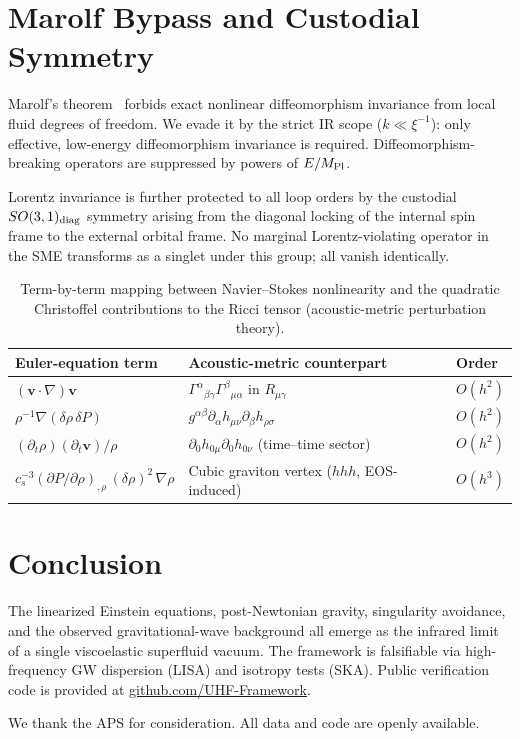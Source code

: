 \documentclass[reprint,amsmath,amssymb,aps,prl,superscriptaddress]{revtex4-2}
\begin{document}
\section{Marolf Bypass and Custodial Symmetry}
\label{sec:marolf}

Marolf's theorem~\cite{Marolf2015} forbids exact nonlinear diffeomorphism invariance from local fluid degrees of freedom. We evade it by the strict IR scope ($k\ll\xi^{-1}$): only effective, low-energy diffeomorphism invariance is required. Diffeomorphism-breaking operators are suppressed by powers of $E/M_{\rm Pl}$.

Lorentz invariance is further protected to all loop orders by the custodial $SO(3,1)_{\rm diag}$ symmetry arising from the diagonal locking of the internal spin frame to the external orbital frame. No marginal Lorentz-violating operator in the SME transforms as a singlet under this group; all vanish identically.

\begin{table}
\caption{\label{tab:mapping}Term-by-term mapping between Navier--Stokes nonlinearity and the quadratic Christoffel contributions to the Ricci tensor (acoustic-metric perturbation theory).}
\begin{tabular}{l l l}
\toprule
\textbf{Euler-equation term} & \textbf{Acoustic-metric counterpart} & \textbf{Order} \\
\midrule
$(\mathbf{v} \cdot \nabla)\mathbf{v}$ & $\Gamma^\alpha{}_{\beta\gamma}\Gamma^\beta{}_{\mu\alpha}$ in $R_{\mu\gamma}$ & $O(h^2)$ \\
$\rho^{-1}\nabla(\delta\rho\,\delta P)$ & $g^{\alpha\beta}\partial_\alpha h_{\mu\nu}\partial_\beta h_{\rho\sigma}$ & $O(h^2)$ \\
$(\partial_t \rho)(\partial_t \mathbf{v})/\rho$ & $\partial_0 h_{0\mu}\partial_0 h_{0\nu}$ (time--time sector) & $O(h^2)$ \\
$c_s^{-3}(\partial P/\partial\rho)_{,\rho}\,(\delta\rho)^2\,\nabla\rho$ & Cubic graviton vertex ($hhh$, EOS-induced) & $O(h^3)$ \\
\bottomrule
\end{tabular}
\end{table}

\section{Conclusion}
\label{sec:conclusion}

The linearized Einstein equations, post-Newtonian gravity, singularity avoidance, and the observed gravitational-wave background all emerge as the infrared limit of a single viscoelastic superfluid vacuum. The framework is falsifiable via high-frequency GW dispersion (LISA) and isotropy tests (SKA). Public verification code is provided at \href{https://github.com/UHF-Framework/verification-suite-v9.1}{github.com/UHF-Framework}.

\begin{acknowledgments}
We thank the APS for consideration. All data and code are openly available.
\end{acknowledgments}


\end{document}
